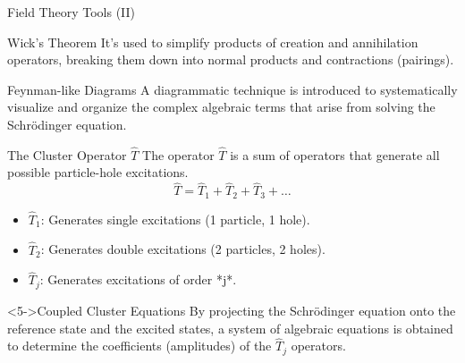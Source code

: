 
\begin{frame}{Field Theory Tools (II)}
    \begin{block}{Wick's Theorem}
        It's used to simplify products of creation and annihilation operators, breaking them down into normal products and contractions (pairings).
    \end{block}
    \pause
    
    \begin{block}{Feynman-like Diagrams}
        A diagrammatic technique is introduced to systematically visualize and organize the complex algebraic terms that arise from solving the Schrödinger equation.
    \end{block}
\end{frame}


\begin{frame}{The Cluster Operator $\hat{T}$}
    The operator $\hat{T}$ is a sum of operators that generate all possible particle-hole excitations.
    \[
    \hat{T} = \hat{T}_1 + \hat{T}_2 + \hat{T}_3 + \dots
    \]
    \pause

    \begin{itemize}
        \item<2-> \textbf{$\hat{T}_1$}: Generates single excitations (1 particle, 1 hole).
        \item<3-> \textbf{$\hat{T}_2$}: Generates double excitations (2 particles, 2 holes).
        \item<4-> \textbf{$\hat{T}_j$}: Generates excitations of order *j*.
    \end{itemize}
    \pause

    \begin{exampleblock}<5->{Coupled Cluster Equations}
        By projecting the Schrödinger equation onto the reference state and the excited states, a system of algebraic equations is obtained to determine the coefficients (amplitudes) of the $\hat{T}_j$ operators.
    \end{exampleblock}
\end{frame}



